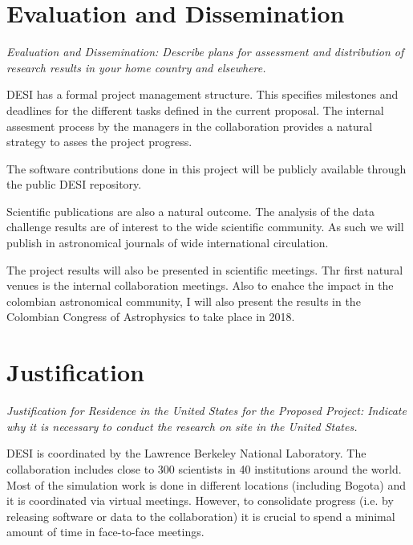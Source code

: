 \documentclass[12pt]{article}
\begin{document}
\section*{Evaluation and Dissemination}
\textit{Evaluation and Dissemination: Describe plans for assessment and
distribution of research results in your home country and elsewhere.}


DESI has a formal project management structure. This specifies milestones
and deadlines for the different tasks defined in the current
proposal. The internal assesment process by the managers in the
collaboration provides a natural strategy to asses the project
progress. 

The software contributions done in this project will be publicly
available through the public DESI repository. 


Scientific publications are also a natural outcome. The analysis of the
data challenge results are of interest to the wide scientific
community. As such we will publish in astronomical journals of wide
international circulation.

The project results will also be presented in scientific meetings. Thr
first natural venues is the internal collaboration meetings. Also to
enahce the impact in the colombian astronomical community, I will also 
present the results in the Colombian Congress of Astrophysics to take
place in 2018.  




\section*{Justification}
\textit{Justification for Residence in the United States for the Proposed
Project: Indicate why it is necessary to conduct the research on site
 in the United States. }

DESI is coordinated by the Lawrence Berkeley National Laboratory. The
collaboration includes close to 300 scientists in 40 institutions
around the world. 
Most of the simulation work is done in different locations (including
Bogota) and it is coordinated via virtual meetings.  
However, to consolidate progress (i.e. by releasing software or data
to the collaboration) it is crucial to spend a minimal amount of time
in face-to-face meetings. 
\end{document}
